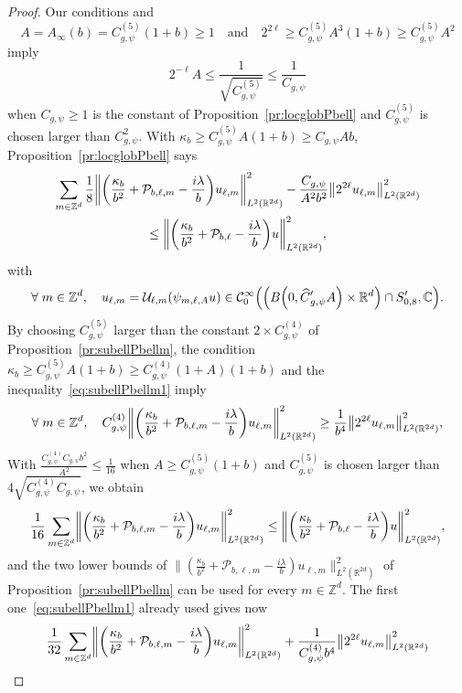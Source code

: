 \documentclass[AHL,Unicode,longabstracts]{cedram}
\newcommand{\C}{\mathbb{C}}
\newcommand{\Z}{\mathbb{Z}}
\newcommand{\R}{\mathbb{R}}
\newcommand{\clC}{\mathcal{C}}
\newcommand{\clP}{\mathcal{P}}
\newcommand{\clU}{\mathcal{U}}
\newcommand\norm[1]{\left\lVert#1\right\rVert}
\let\oldhat\hat
\renewcommand*{\hat}[1]{\mathchoice{\widehat{#1}}{\widehat{#1}}{\oldhat{#1}}{\oldhat{#1}}}
\let\oldforall\forall
\renewcommand*{\forall}{\mathrel{\oldforall}}
\let\originalleft\left
\let\originalright\right
\renewcommand{\left}{\mathopen{}\mathclose\bgroup\originalleft}
\renewcommand{\right}{\aftergroup\egroup\originalright}
\begin{document}
\begin{proof}
Our conditions and
\[
A=A_\infty(b)=C_{{g,\psi}}^{(5)}(1+b)\geq 1 \quad\text{and}\quad 2^{2\ell}\geq C_{g,\psi}^{(5)}A^{3}(1+b)\geq C_{{g,\psi}}^{(5)}A^{2}
\]
imply
\[
2^{-\ell}A\leq \frac{1}{\sqrt{C_{g,\psi}^{(5)}}}\leq \frac{1}{C_{g,\psi}}
\]
when $C_{g,\psi}\geq 1$ is the constant of Proposition~\ref{pr:locglobPbell} and $C_{{g,\psi}}^{(5)}$ is chosen larger than $C_{g,\psi}^{2}$. With $\kappa_{b}\geq C_{g,\psi}^{(5)}A(1+b) \geq C_{g,\psi}Ab$, Proposition~\ref{pr:locglobPbell} says
\begin{multline*}
\sum_{m\in \Z^d}\frac{1}{8}\left\| \left(\frac{\kappa_{b}}{b^{2}}+\clP_{b,\ell,m} - \frac{i\lambda}{b}\right) u_{\ell,m}\right\|^{2}_{L^2(\R^{2d})}-\frac{C_{g,\psi}}{A^2b^2}\norm{2^{2\ell}u_{\ell,m}}_{L^2(\R^{2d})}^2
\\
\leq
\left\|\left(\frac{\kappa_{b}}{b^{2}}+\clP_{b,\ell} - \frac{i\lambda}{b}\right) u \right\|^{2}_{L^2(\R^{2d})},
\end{multline*}
with
\[
\forall m\in\Z^{d},\quad u_{\ell,m}=\clU_{\ell,m}(\psi_{m,\ell,A}u) \in \clC^\infty_0\left(\left(B\left(0,\hat{C}'_{g,\psi}A\right)\times \R^d\right)\cap S_{0,8}',\C\right).
\]
By choosing $C_{g,\psi}^{(5)}$ larger than the constant $2\times C_{{g,\psi}}^{(4)}$ of Proposition~\ref{pr:subellPbellm}, the condition $\kappa_{b}\geq C_{g,\psi}^{(5)}A(1+b)\geq C_{{g,\psi}}^{(4)}(1+A)(1+b)$ and the inequality~\eqref{eq:subellPbellm1} imply
\[
\forall m\in\Z^{d},\quad C_{g,\psi}^{(4)} \left\|\left(\frac{\kappa_b}{b^2}+\clP_{b,\ell,m}-\frac{i\lambda}{b}\right)u_{\ell,m}\right\|_{L^{2}(\R^{2d})}^2 \geq \frac{1}{b^4}\left\|2^{2\ell} u_{\ell,m}\right\|^2_{L^2(\R^{2d})},
\]
With $\frac{C_{g,\psi}^{(4)}C_{g,\psi}b^{2}}{A^{2}}\leq \frac{1}{16}$ when $A\geq C_{g,\psi}^{(5)}(1+b)$ and $C_{g,\psi}^{(5)}$ is chosen larger than $4\sqrt{C_{g,\psi}^{(4)}C_{g,\psi}}$, we obtain
\[
\frac{1}{16}\sum_{m\in \Z^d}\left\| \left(\frac{\kappa_{b}}{b^{2}}+\clP_{b,\ell,m} - \frac{i\lambda}{b}\right) u_{\ell,m}\right\|^{2}_{L^2(\R^{2d})}
\leq
\left\|\left(\frac{\kappa_{b}}{b^{2}}+\clP_{b,\ell} - \frac{i\lambda}{b}\right) u \right\|^{2}_{L^2(\R^{2d})},
\]
and the two lower bounds of $\| (\frac{\kappa_{b}}{b^{2}}+\clP_{b,\ell,m} - \frac{i\lambda}{b}) u_{\ell,m}\|^{2}_{L^2(\R^{2d})}$ of Proposition~\ref{pr:subellPbellm} can be used for every $m\in\Z^{d}$. The first one~\eqref{eq:subellPbellm1} already used gives now
\begin{multline*}
\frac{1}{32}\sum_{m\in \Z^d}\left\| \left(\frac{\kappa_{b}}{b^{2}}+\clP_{b,\ell,m} - \frac{i\lambda}{b}\right) u_{\ell,m}\right\|^{2}_{L^2(\R^{2d})}+\frac{1}{C_{g,\psi}^{(4)}b^{4}}\left\|2^{2\ell}u_{\ell,m}\right\|^{2}_{L^{2}(\R^{2d})}

\end{multline*}
\end{proof}
\end{document}

